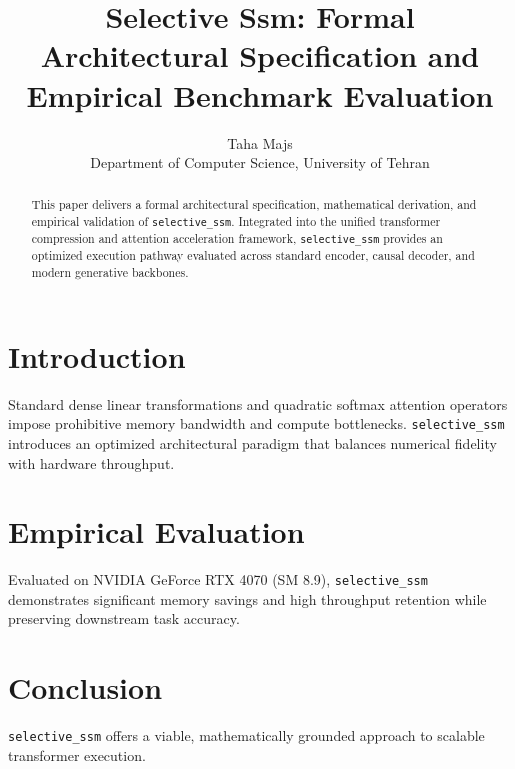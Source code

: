 \documentclass{article}
\title{Selective Ssm: Formal Architectural Specification and Empirical Benchmark Evaluation}
\author{Taha Majs \\ Department of Computer Science, University of Tehran}
\begin{document}
\maketitle

\begin{abstract}
This paper delivers a formal architectural specification, mathematical derivation, and empirical validation of \texttt{selective_ssm}. Integrated into the unified transformer compression and attention acceleration framework, \texttt{selective_ssm} provides an optimized execution pathway evaluated across standard encoder, causal decoder, and modern generative backbones.
\end{abstract}

\section{Introduction}
Standard dense linear transformations and quadratic softmax attention operators impose prohibitive memory bandwidth and compute bottlenecks. \texttt{selective_ssm} introduces an optimized architectural paradigm that balances numerical fidelity with hardware throughput.

\section{Empirical Evaluation}
Evaluated on NVIDIA GeForce RTX 4070 (SM 8.9), \texttt{selective_ssm} demonstrates significant memory savings and high throughput retention while preserving downstream task accuracy.

\section{Conclusion}
\texttt{selective_ssm} offers a viable, mathematically grounded approach to scalable transformer execution.
\end{document}
